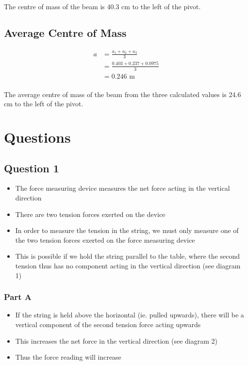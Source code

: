 \documentclass[a4paper,11pt]{article}
\begin{document}
The centre of mass of the beam is 40.3 cm to the left of the pivot.


\subsection{Average Centre of Mass}

$$
\begin{aligned}
a & = \frac{a_1 + a_2 + a_3}{3} \\
& = \frac{0.403 + 0.237 + 0.0975}{3} \\
& = 0.246\mbox{ m} \\
\end{aligned}
$$

The average centre of mass of the beam from the three calculated values is
24.6 cm to the left of the pivot.

\section{Questions}

\subsection{Question 1}

\begin{itemize}
\item The force measuring device measures the net force acting in the vertical direction
\item There are two tension forces exerted on the device
\item In order to measure the tension in the string, we must only measure one of the two tension forces
	exerted on the force measuring device
\item This is possible if we hold the string parallel to the table, where the second tension thus has no
	component acting in the vertical direction (see diagram 1)
\end{itemize}

\subsubsection{Part A}

\begin{itemize}
\item If the string is held above the horizontal (ie. pulled upwards), there will be a vertical component
	of the second tension force acting upwards
\item This increases the net force in the vertical direction (see diagram 2)
\item Thus the force reading will increase
\end{itemize}
\end{document}
